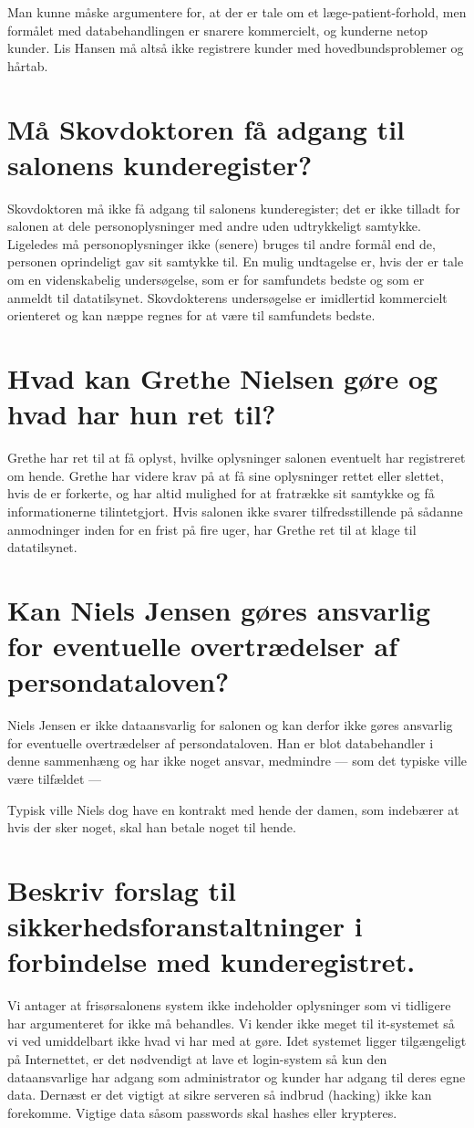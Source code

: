 \documentclass{article}
\begin{document}
Man kunne måske argumentere for, at der er tale om et læge-patient-forhold, men formålet med databehandlingen er snarere kommercielt, og kunderne netop kunder. Lis Hansen må altså ikke registrere kunder med hovedbundsproblemer og hårtab.

\section{Må Skovdoktoren få adgang til salonens kunderegister?}
Skovdoktoren må ikke få adgang til salonens kunderegister; det er ikke tilladt for salonen at dele personoplysninger med andre uden udtrykkeligt samtykke. Ligeledes må personoplysninger ikke (senere) bruges til andre formål end de, personen oprindeligt gav sit samtykke til. En mulig undtagelse er, hvis der er tale om en videnskabelig undersøgelse, som er for samfundets bedste og som er anmeldt til datatilsynet. Skovdokterens undersøgelse er imidlertid kommercielt orienteret og kan næppe regnes for at være til samfundets bedste.

\section{Hvad kan Grethe Nielsen gøre og hvad har hun ret til?}
Grethe har ret til at få oplyst, hvilke oplysninger salonen eventuelt har registreret om hende. Grethe har videre krav på at få sine oplysninger rettet eller slettet, hvis de er forkerte, og har altid mulighed for at fratrække sit samtykke og få informationerne tilintetgjort. Hvis salonen ikke svarer tilfredsstillende på sådanne anmodninger inden for en frist på fire uger, har Grethe ret til at klage til datatilsynet.

\section{Kan Niels Jensen gøres ansvarlig for eventuelle overtrædelser af persondataloven?}
Niels Jensen er ikke dataansvarlig for salonen og kan derfor ikke gøres ansvarlig for eventuelle overtrædelser af persondataloven. Han er blot databehandler i denne sammenhæng og har ikke noget ansvar, medmindre --- som det typiske ville være tilfældet --- 

Typisk ville Niels dog have en kontrakt med hende der damen, som indebærer at hvis der sker noget, skal han betale noget til hende.

\section{Beskriv forslag til sikkerhedsforanstaltninger i forbindelse med kunderegistret.}

Vi antager at frisørsalonens system ikke indeholder oplysninger som vi tidligere har argumenteret for ikke må behandles. Vi kender ikke meget til it-systemet så vi ved umiddelbart ikke hvad vi har med at gøre. Idet systemet ligger tilgængeligt på Internettet, er det nødvendigt at lave et login-system så kun den dataansvarlige har adgang som administrator og kunder har adgang til deres egne data. Dernæst er det vigtigt at sikre serveren så indbrud (hacking) ikke kan forekomme. Vigtige data såsom passwords skal hashes eller krypteres.
\end{document}
